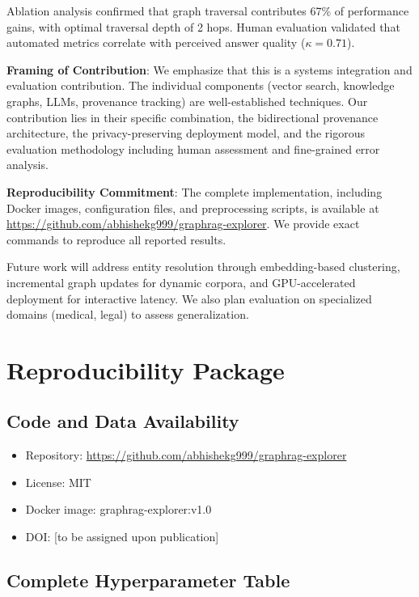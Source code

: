 \documentclass[conference]{IEEEtran}
\begin{document}
Ablation analysis confirmed that graph traversal contributes 67\% of performance gains, with optimal traversal depth of 2 hops. Human evaluation validated that automated metrics correlate with perceived answer quality ($\kappa = 0.71$).

\textbf{Framing of Contribution}: We emphasize that this is a systems integration and evaluation contribution. The individual components (vector search, knowledge graphs, LLMs, provenance tracking) are well-established techniques. Our contribution lies in their specific combination, the bidirectional provenance architecture, the privacy-preserving deployment model, and the rigorous evaluation methodology including human assessment and fine-grained error analysis.

\textbf{Reproducibility Commitment}: The complete implementation, including Docker images, configuration files, and preprocessing scripts, is available at \url{https://github.com/abhishekg999/graphrag-explorer}. We provide exact commands to reproduce all reported results.

Future work will address entity resolution through embedding-based clustering, incremental graph updates for dynamic corpora, and GPU-accelerated deployment for interactive latency. We also plan evaluation on specialized domains (medical, legal) to assess generalization.

\onecolumn

\appendix

\section{Reproducibility Package}

\subsection{Code and Data Availability}

\begin{itemize}
    \item Repository: \url{https://github.com/abhishekg999/graphrag-explorer}
    \item License: MIT
    \item Docker image: graphrag-explorer:v1.0
    \item DOI: [to be assigned upon publication]
\end{itemize}

\subsection{Complete Hyperparameter Table}
\end{document}
